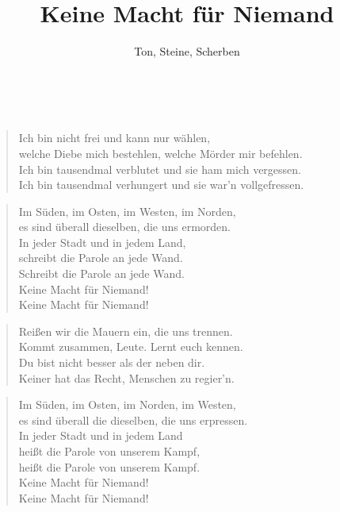 \documentclass[9pt,a4paper,oneside, onecolumn]{article}
\author{Ton, Steine, Scherben}
\title{Keine Macht für Niemand}
\date{}
\begin{document}
\raggedcolumns
\maketitle
\thispagestyle{empty}

\mbox{
}\\

\begin{verse}
Ich bin nicht frei und kann nur wählen,\\
welche Diebe mich bestehlen, welche Mörder mir befehlen.\\
Ich bin tausendmal verblutet und sie ham mich vergessen.\\
Ich bin tausendmal verhungert und sie war'n vollgefressen.\\
\end{verse}


\begin{verse}
Im Süden, im Osten, im Westen, im Norden,\\
es sind überall dieselben, die uns ermorden.\\
In jeder Stadt und in jedem Land,\\
schreibt die Parole an jede Wand.\\
Schreibt die Parole an jede Wand.\\
Keine Macht\quad{} für Niemand!\\
Keine Macht\quad{} für Niemand!\\
\end{verse}

\begin{verse}
Reißen wir die Mauern ein, die uns trennen.\\
Kommt zusammen, Leute. Lernt euch kennen.\\
Du bist nicht besser als der neben dir.\\
Keiner hat das Recht, Menschen zu regier'n.\\
\end{verse}

\begin{verse}
Im Süden, im Osten, im Norden, im Westen,\\
es sind überall die dieselben, die uns erpressen.\\
In jeder Stadt und in jedem Land\\
heißt die Parole von unserem Kampf,\\
heißt die Parole von unserem Kampf.\\
Keine Macht für Niemand!\\
Keine Macht für Niemand!\\
\end{verse}
\end{document}
